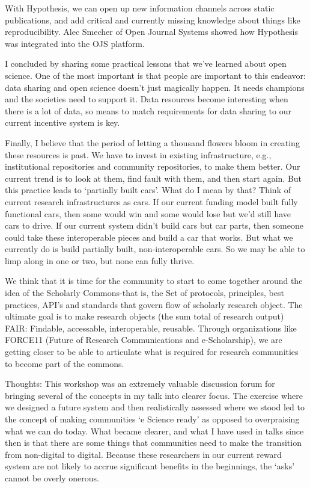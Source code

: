 \documentclass[a4paper,UKenglish]{dagrep}
\begin{document}
With Hypothesis, we can open up new information channels across static
publications, and add critical and currently missing knowledge about things like
reproducibility.  Alec Smecher of Open Journal Systems showed how Hypothesis was
integrated into the OJS platform.

I concluded by sharing some practical lessons that we've learned about open
science.  One of the most important is that people are important to this
endeavor:  data sharing and open science doesn't just magically happen.  It
needs champions and the societies need to support it.  Data resources become
interesting when there is a lot of data, so means to match requirements for data
sharing to our current incentive system is key.  

Finally, I believe that the period of letting a thousand flowers bloom in
creating these resources is past.  We have to invest in existing infrastructure,
e.g., institutional repositories and community repositories, to make them
better.  Our current trend is to look at them, find fault with them, and then
start again.  But this practice leads to `partially built cars'.  What do I mean
by that?  Think of current research infrastructures as cars.  If our current
funding model built fully functional cars, then some would win and some would
lose but we'd still have cars to drive.  If our current system didn't build cars
but car parts, then someone could take these interoperable pieces and build a
car that works.  But what we currently do is build partially built,
non-interoperable cars.  So we may be able to limp along in one or two, but none
can fully thrive.

We think that it is time for the community to start to come together around the
idea of the Scholarly Commons-that is, the Set of protocols, principles, best
practices, API's and standards that govern flow of scholarly research object. 
The ultimate goal is to make research objects (the sum total of research output)
FAIR:  Findable, accessable, interoperable, reusable.  Through organizations
like FORCE11 (Future of Research Communications and e-Scholarship), we are
getting closer to be able to articulate what is required for research
communities to become part of the commons.  

Thoughts:  This workshop was an extremely valuable discussion forum for bringing
several of the concepts in my talk into clearer focus.  The exercise where we
designed a future system and then realistically assessed where we stood led to
the concept of making communities `e Science ready' as opposed to overpraising
what we can do today.  What became clearer, and what I have used in talks since
then is that there are some things that communities need to make the transition
from non-digital to digital.  Because these researchers in our current reward
system are not likely to accrue significant benefits in the beginnings, the
`asks' cannot be overly onerous.  
\end{document}
